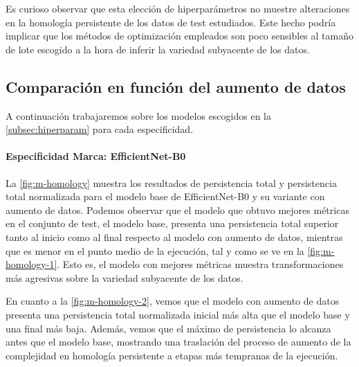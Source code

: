 Es curioso observar que esta elección de hiperparámetros no muestre alteraciones en la homología persistente de los datos de test estudiados. Este hecho podría implicar que los métodos de optimización empleados son poco sensibles al tamaño de lote escogido a la hora de inferir la variedad subyacente de los datos.

\subsection{Comparación en función del aumento de datos}
\label{subsec:aug}

A continuación trabajaremos sobre los modelos escogidos en la \autoref{subsec:hiperparam} para cada especificidad.

\paragraph{Especificidad Marca: EfficientNet-B0}

La \autoref{fig:m-homology} muestra los resultados de persistencia total y persistencia total normalizada para el modelo base de EfficientNet-B0 y su variante con aumento de datos. Podemos observar que el modelo que obtuvo mejores métricas en el conjunto de test, el modelo base, presenta una persistencia total superior tanto al inicio como al final respecto al modelo con aumento de datos, mientras que es menor en el punto medio de la ejecución, tal y como se ve en la \autoref{fig:m-homology-1}. Esto es, el modelo con mejores métricas muestra transformaciones más agresivas sobre la variedad subyacente de los datos.

En cuanto a la \autoref{fig:m-homology-2}, vemos que el modelo con aumento de datos presenta una persistencia total normalizada inicial más alta que el modelo base y una final más baja. Además, vemos que el máximo de persistencia lo alcanza antes que el modelo base, mostrando una traslación del proceso de aumento de la complejidad en homología persistente a etapas más tempranas de la ejecución.

